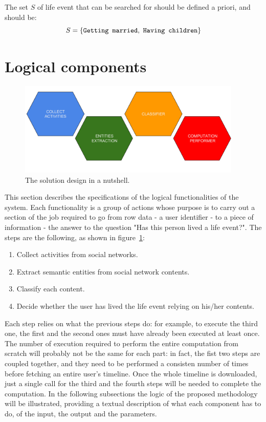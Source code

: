 The set $S$ of life event that can be searched for should be defined a priori, and should be: 
\[
S = \{\text{\texttt{Getting married}}, \text{ \texttt{Having children}}\}
\]

\section{Logical components}
\label{sec:logicdescr}

\begin{figure}
\centering
\includegraphics[width=%
0.95\textwidth]{img/Solutiondesign_nutshell}
\caption{The solution design in a nutshell.}
\label{fig:nutshell}
\end{figure}

This section describes the specifications of the logical functionalities of the system. Each functionality is a group of actions whose purpose is to carry out a section of the job required to go from row data - a user identifier - to a piece of information - the answer to the question "Has this person lived a life event?". The steps are the following, as shown in figure~\ref{fig:nutshell}:
\begin{enumerate}
\item Collect activities from social networks.
\item Extract semantic entities from social network contents.
\item Classify each content.
\item Decide whether the user has lived the life event relying on his/her contents.
\end{enumerate}
Each step relies on what the previous steps do: for example, to execute the third one, the first and the second ones must have already been executed at least once. The number of execution required to perform the entire computation from scratch will probably not be the same for each part: in fact, the fist two steps are coupled together, and they need to be performed a consisten number of times before fetching an entire user's timeline. Once the whole timeline is downloaded, just a single call for the third and the fourth steps will be needed to complete the computation. In the following subsections the logic of the proposed methodology will be illustrated, providing a textual description of what each component has to do, of the input, the output and the parameters. 

